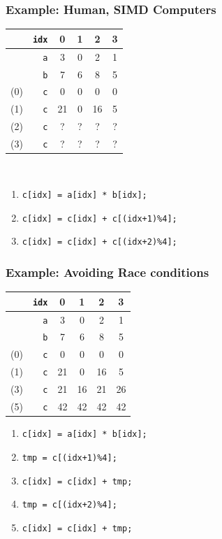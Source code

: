 \documentclass[handout]{beamer}
\begin{document}
\begin{frame}
  \frametitle{Example: Human, SIMD Computers}
  \centering
  \begin{tabular}{cr|c|c|c|c|}
    &\texttt{idx} & 0 & 1 & 2 & 3 \\
    \hline
    &\texttt{a} & 3 & 0 & 2 & 1 \\
    &\texttt{b} & 7 & 6 & 8 & 5 \\
    (0) & \texttt{c} & 0 & 0 & 0 & 0 \\
    (1) & \texttt{c} & 21 & 0 & 16 & 5 \\
    (2) & \texttt{c} & ? & ? & ? & ? \\
    (3) & \texttt{c} & ? & ? & ? & ? \\
  \end{tabular}
  \\
  \vspace{10pt}
  \begin{enumerate}
  \item \texttt{c[idx] = a[idx] * b[idx];}
  \item \texttt{c[idx] = c[idx] + c[(idx+1)\%4];}
  \item \texttt{c[idx] = c[idx] + c[(idx+2)\%4];}
  \end{enumerate}
\end{frame}

\begin{frame}
  \frametitle{Example: Avoiding Race conditions}
  \centering
  \begin{tabular}{cr|c|c|c|c|}
    &\texttt{idx} & 0 & 1 & 2 & 3 \\
    \hline
    &\texttt{a} & 3 & 0 & 2 & 1 \\
    &\texttt{b} & 7 & 6 & 8 & 5 \\
    (0) & \texttt{c} & 0 & 0 & 0 & 0 \\
    (1) & \texttt{c} & 21 & 0 & 16 & 5 \\
    (3) & \texttt{c} & 21 & 16 & 21 & 26 \\
    (5) & \texttt{c} & 42 & 42 & 42 & 42 \\
  \end{tabular}
  \vspace{10pt}
  \begin{enumerate}
  \item \texttt{c[idx] = a[idx] * b[idx];}
  \item \texttt{tmp = c[(idx+1)\%4];}
  \item \texttt{c[idx] = c[idx] + tmp;}
  \item \texttt{tmp = c[(idx+2)\%4];}
  \item \texttt{c[idx] = c[idx] + tmp;}
  \end{enumerate}
\end{frame}
\end{document}
